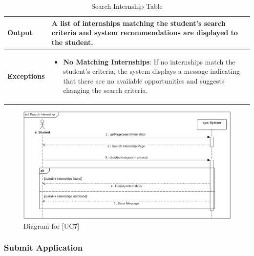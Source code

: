 \begin{table}[H]
\begin{tabular}{|p{4cm}|p{11cm}|}
    \textbf{Output} & 
    A list of internships matching the student’s search criteria and system recommendations are displayed to the student. \\ \hline
    \textbf{Exceptions} & 
    {\setlength{\leftmargini}{1.1em}
    \begin{itemize}
        \item \textbf{No Matching Internships}: If no internships match the student's criteria, the system displays a message indicating that there are no available opportunities and suggests changing the search criteria.
    \end{itemize}} \\ \hline
    \end{tabular}
    \caption{Search Internship Table}
\end{table}

\begin{figure} [H]
    \centering
    \includegraphics[width=1\linewidth]{Use Cases Images/search_internship.png}
    \caption{Diagram for [UC7]}
    \label{fig: Search Internship Diagram}
\end{figure}

\subsubsection*{Submit Application}

